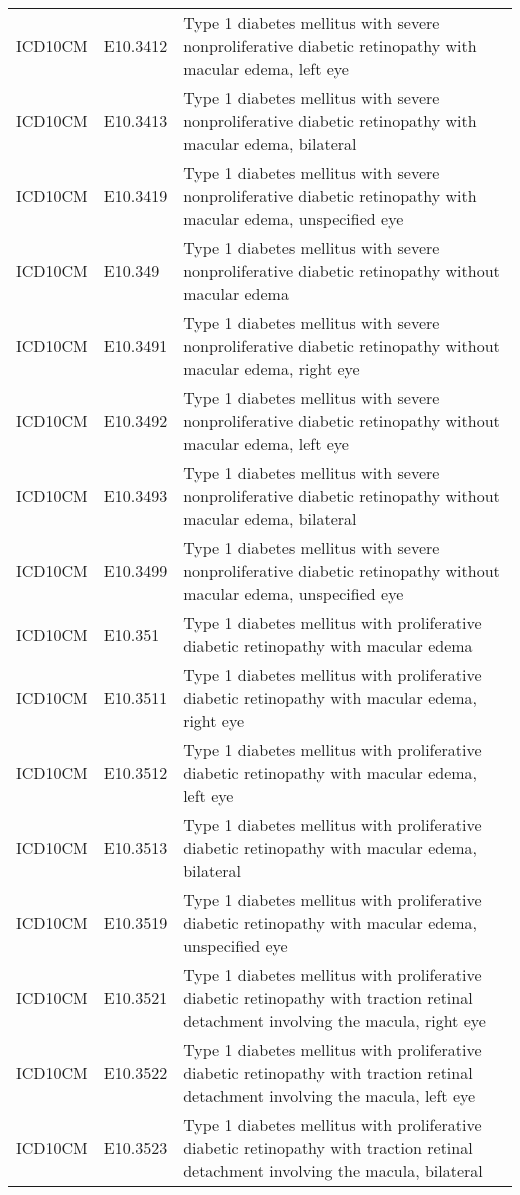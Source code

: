 \begin{longtable}{p{}p{}p{}}
  ICD10CM & E10.3412 & Type 1 diabetes mellitus with severe nonproliferative diabetic retinopathy with macular edema, left eye \\ 
  ICD10CM & E10.3413 & Type 1 diabetes mellitus with severe nonproliferative diabetic retinopathy with macular edema, bilateral \\ 
  ICD10CM & E10.3419 & Type 1 diabetes mellitus with severe nonproliferative diabetic retinopathy with macular edema, unspecified eye \\ 
  ICD10CM & E10.349 & Type 1 diabetes mellitus with severe nonproliferative diabetic retinopathy without macular edema \\ 
  ICD10CM & E10.3491 & Type 1 diabetes mellitus with severe nonproliferative diabetic retinopathy without macular edema, right eye \\ 
  ICD10CM & E10.3492 & Type 1 diabetes mellitus with severe nonproliferative diabetic retinopathy without macular edema, left eye \\ 
  ICD10CM & E10.3493 & Type 1 diabetes mellitus with severe nonproliferative diabetic retinopathy without macular edema, bilateral \\ 
  ICD10CM & E10.3499 & Type 1 diabetes mellitus with severe nonproliferative diabetic retinopathy without macular edema, unspecified eye \\ 
  ICD10CM & E10.351 & Type 1 diabetes mellitus with proliferative diabetic retinopathy with macular edema \\ 
  ICD10CM & E10.3511 & Type 1 diabetes mellitus with proliferative diabetic retinopathy with macular edema, right eye \\ 
  ICD10CM & E10.3512 & Type 1 diabetes mellitus with proliferative diabetic retinopathy with macular edema, left eye \\ 
  ICD10CM & E10.3513 & Type 1 diabetes mellitus with proliferative diabetic retinopathy with macular edema, bilateral \\ 
  ICD10CM & E10.3519 & Type 1 diabetes mellitus with proliferative diabetic retinopathy with macular edema, unspecified eye \\ 
  ICD10CM & E10.3521 & Type 1 diabetes mellitus with proliferative diabetic retinopathy with traction retinal detachment involving the macula, right eye \\ 
  ICD10CM & E10.3522 & Type 1 diabetes mellitus with proliferative diabetic retinopathy with traction retinal detachment involving the macula, left eye \\ 
  ICD10CM & E10.3523 & Type 1 diabetes mellitus with proliferative diabetic retinopathy with traction retinal detachment involving the macula, bilateral \\ 

\end{longtable}
